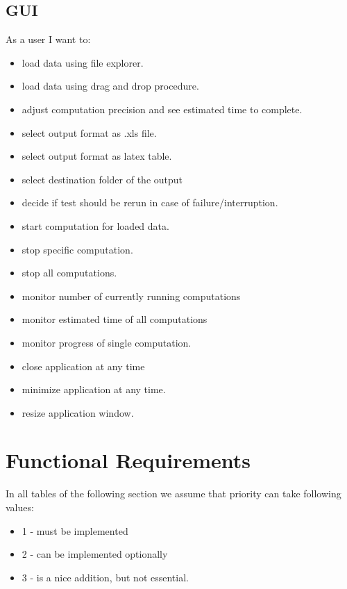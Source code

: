 \documentclass{article}
\begin{document}
\subsection{GUI}
As a user I want to:
\begin{itemize}
	\item
		load data using file explorer.
	\item
		load data using drag and drop procedure.
	\item
		adjust computation precision and see estimated time to complete.
	\item
		select output format as .xls file.
	\item
		select output format as latex table.
	\item
		select destination folder of the output
	\item
		decide if test should be rerun in case of failure/interruption.
	\item 
		start computation for loaded data.
	\item
		stop specific computation.
	\item
		stop all computations.
	\item 
		monitor number of currently running computations
	\item
		monitor estimated time of all computations
	\item
		monitor progress of single computation.
	\item
		close application at any time
	\item
		minimize application at any time.
	\item 
		resize application window.
\end{itemize}



\newpage

\section{Functional Requirements}
In all tables of the following section we assume that priority can take following values:
\begin{itemize} 
	\item 1 - must be implemented
	\item 2 - can be implemented optionally 
	\item 3 - is a nice addition, but not essential.
\end{itemize} 

\end{document}
